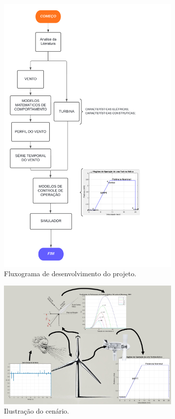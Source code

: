 \begin{figure}[H]
    \caption{Fluxograma de desenvolvimento do projeto.}      
    \label{fig:fluxogramaTCC}
    \centering
    \includegraphics[width=0.8\textwidth]{Figuras/Teorico/TCC - AEROGERADOR.png}  
\end{figure}

\begin{figure}[H]
    \caption{Ilustração do cenário.}      
    \label{fig:ilustracaoDoCenário}
    \centering
    \includegraphics[width=0.8\textwidth]{Figuras/Teorico/metodologia_page-0001.jpg}  
\end{figure}
